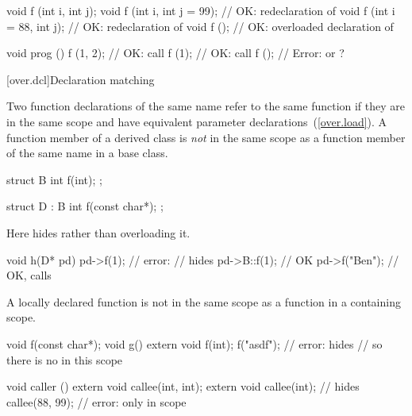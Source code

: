 \begin{itemize}
\begin{codeblock}
void f (int i, int j);
void f (int i, int j = 99);     // OK: redeclaration of 
void f (int i = 88, int j);     // OK: redeclaration of 
void f ();                      // OK: overloaded declaration of 

void prog () {
    f (1, 2);                   // OK: call 
    f (1);                      // OK: call 
    f ();                       // Error:  or ?
}
\end{codeblock}
\exitexample
\exitnote
\end{itemize}

[over.dcl]{Declaration matching}%
%
%

\pnum
Two function declarations of the same name refer to the same function if they
are in the same scope and have equivalent parameter declarations~(\ref{over.load}).
A function member of a derived class is
\textit{not}
in the same scope as a function member of the same name in a base class.
\enterexample

\begin{codeblock}
struct B {
  int f(int);
};

struct D : B {
  int f(const char*);
};
\end{codeblock}

%
%
Here
hides
rather than overloading it.

%
\begin{codeblock}
void h(D* pd) {
  pd->f(1);                     // error:
                                //  hides 
  pd->B::f(1);                  // OK
  pd->f("Ben");                 // OK, calls 
}
\end{codeblock}
\exitexample

\pnum
A locally declared function is not in the same scope as a function in
a containing scope.
\enterexample

\begin{codeblock}
void f(const char*);
void g() {
  extern void f(int);
  f("asdf");                    // error:  hides 
                                // so there is no  in this scope
}

void caller () {
  extern void callee(int, int);
  {
    extern void callee(int);    // hides 
    callee(88, 99);             // error: only  in scope
  }
}
\end{codeblock}
\exitexample

